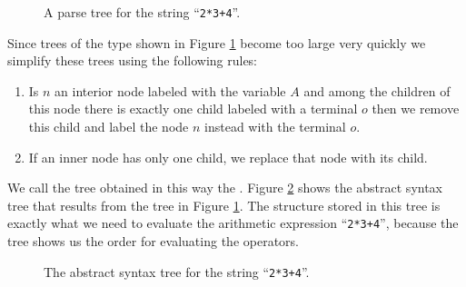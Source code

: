 \begin{figure}[!ht]
  \centering
  \caption{A parse tree for the string ``\texttt{2*3+4}''.}
  \label{fig:parse-tree.dot}
\end{figure}

Since trees of the type shown in Figure \ref{fig:parse-tree.dot} become too large very quickly
we simplify these trees using the following rules:
\begin{enumerate}
\item Is $n$ an interior node labeled with the variable $A$
      and among the children of this node there is exactly one child labeled with a terminal $o$
      then we remove this child and label the node $n$ instead with the
      terminal $o$.
\item If an inner node has only one child, we replace that node with its child.
\end{enumerate}
We call the tree obtained in this way the .
Figure \ref{fig:abstract-syntax-tree.dot} shows the abstract syntax tree that results
from the tree in Figure \ref{fig:parse-tree.dot}.  The structure stored in this tree is exactly what we need 
to evaluate the arithmetic expression ``\texttt{2*3+4}'', because the tree shows us
the order for evaluating the operators.

\begin{figure}[!ht]
  \centering
  \caption{The abstract syntax tree for the string ``\texttt{2*3+4}''.}
  \label{fig:abstract-syntax-tree.dot}
\end{figure}

